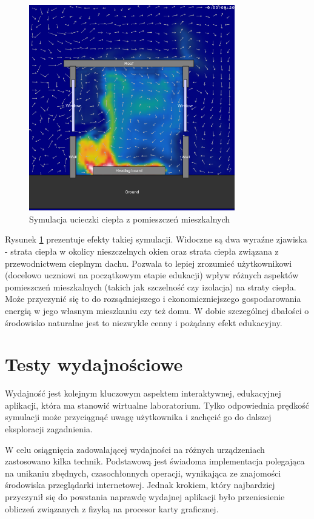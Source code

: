 \begin{figure}[!h]
\centering
\includegraphics[width=0.8\textwidth]{img/physics/wind}
\caption{Symulacja ucieczki ciepła z pomieszczeń mieszkalnych}
\label{fig:wind}
\end{figure}

Rysunek \ref{fig:wind} prezentuje efekty takiej symulacji. Widoczne są dwa
wyraźne zjawiska - strata ciepła w okolicy nieszczelnych okien oraz strata
ciepła związana z przewodnictwem cieplnym dachu. Pozwala to lepiej zrozumieć
użytkownikowi (docelowo uczniowi na początkowym etapie edukacji) wpływ różnych
aspektów pomieszczeń mieszkalnych (takich jak szczelność czy izolacja) na straty
ciepła. Może przyczynić się to do rozsądniejszego i ekonomiczniejszego
gospodarowania energią w jego własnym mieszkaniu czy też domu. W dobie
szczególnej dbałości o środowisko naturalne jest to niezwykle cenny i pożądany
efekt edukacyjny.

\section{Testy wydajnościowe}

Wydajność jest kolejnym kluczowym aspektem interaktywnej, edukacyjnej aplikacji,
która ma stanowić wirtualne laboratorium. Tylko odpowiednia prędkość symulacji
może przyciągnąć uwagę użytkownika i zachęcić go do dalszej eksploracji
zagadnienia.

W celu osiągnięcia zadowalającej wydajności na różnych urządzeniach zastosowano
kilka technik. Podstawową jest świadoma implementacja polegająca na unikaniu
zbędnych, czasochłonnych operacji, wynikająca ze znajomości środowiska
przeglądarki internetowej. Jednak krokiem, który najbardziej przyczynił się do
powstania naprawdę wydajnej aplikacji było przeniesienie obliczeń związanych
z fizyką na procesor karty graficznej.

